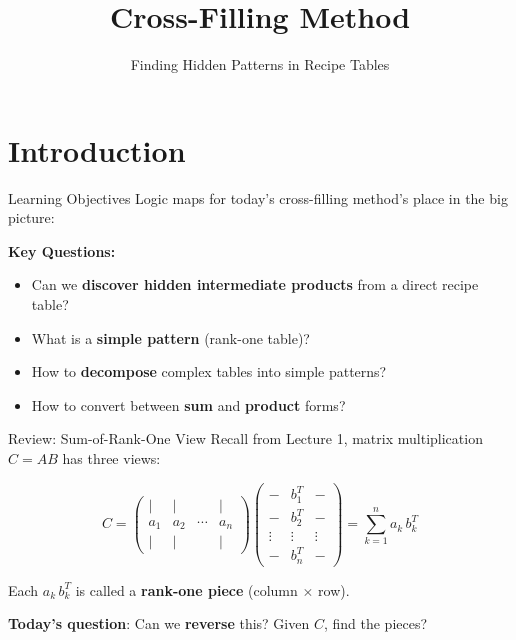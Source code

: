 \documentclass[10pt]{beamer}
\title{Cross-Filling Method}
\subtitle{Finding Hidden Patterns in Recipe Tables}
\date{}
\theoremstyle{definition}
\newcommand{\x}[1]{\alert{\textbf{#1}}}
\begin{document}
\maketitle

\section{Introduction}

\begin{frame}{Learning Objectives}
Logic maps for today's cross-filling method's place in the big picture:

\vspace{0.5cm}
\textbf{Key Questions:}
\begin{itemize}
\item Can we \x{discover hidden intermediate products} from a direct recipe table?
\item What is a \x{simple pattern} (rank-one table)?
\item How to \x{decompose} complex tables into simple patterns?
\item How to convert between \x{sum} and \x{product} forms?
\end{itemize}
\end{frame}

\begin{frame}{Review: Sum-of-Rank-One View}
Recall from Lecture 1, matrix multiplication $C = AB$ has three views:

$$C =
\begin{pmatrix}
| & | & & | \\
a_1 & a_2 & \cdots & a_n \\
| & | & & |
\end{pmatrix}
\begin{pmatrix}
- & b_1^T & - \\
- & b_2^T & - \\
\vdots & \vdots & \vdots \\
- & b_n^T & -
\end{pmatrix}
= \sum_{k=1}^{n} a_k \, b_k^T$$

\vfill
Each $a_k \, b_k^T$ is called a \x{rank-one piece} (column $\times$ row).

\vfill
\textbf{Today's question}: Can we \x{reverse} this? Given $C$, find the pieces?
\end{frame}
\end{document}
